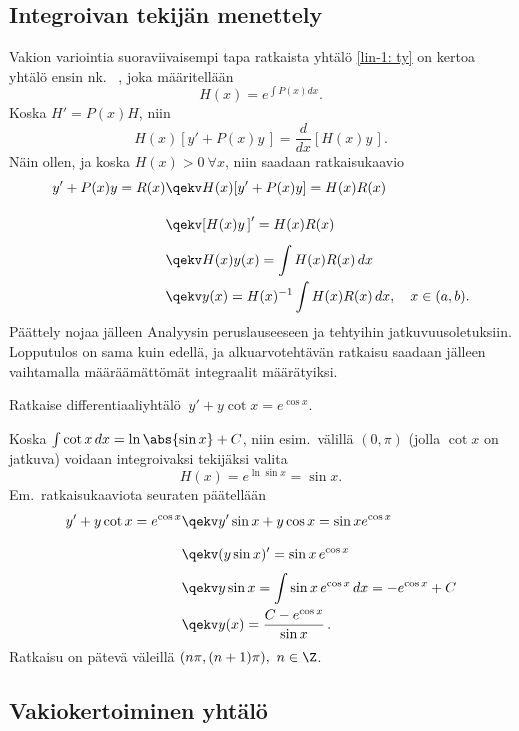 \subsection*{Integroivan tekijän menettely}

Vakion variointia suoraviivaisempi tapa ratkaista yhtälö \eqref{lin-1: ty} on kertoa yhtälö
ensin nk.\ 
, joka määritellään
\[
H(x)= e^{\int P(x)dx}.
\]
Koska $H'=P(x)H$, niin
\[
H(x)[y'+P(x)y\,] = \frac{d}{dx}[H(x)y\,].
\]
Näin ollen, ja koska $H(x)>0\ \forall x$, niin saadaan ratkaisukaavio
\begin{align*}
y'+P(x)y = R(x) &\qekv H(x)[y'+P(x)y] = H(x)R(x) \\[3.5mm]
                &\qekv [H(x)y\,]' = H(x)R(x) \\[1.5mm]
                &\qekv H(x)y(x) = \int H(x)R(x)\,dx \\
                &\qekv y(x) = H(x)^{-1}\int H(x)R(x)\,dx, \quad x\in(a,b).
\end{align*}
Päättely nojaa jälleen Analyysin peruslauseeseen ja tehtyihin jatkuvuusoletuksiin. Lopputulos
on sama kuin edellä, ja alkuarvotehtävän ratkaisu saadaan jälleen vaihtamalla määräämättömät
integraalit määrätyiksi.
\begin{Exa}
Ratkaise differentiaaliyhtälö $\ y'+y\cot x=e^{\cos x}$.
\end{Exa}
\ratk Koska $\int \cot x\,dx=\ln\abs{\sin x}+C$, niin esim.\ välillä $(0,\pi)$ 
(jolla $\cot x$ on jatkuva) voidaan integroivaksi tekijäksi valita
\[
H(x)=e^{\ln\sin x}=\sin x.
\]
Em.\ ratkaisukaaviota seuraten päätellään
\begin{align*}
y'+y\cot x=e^{\cos x} &\qekv y'\sin x+y\cos x = \sin x e^{\cos x} \\[3mm]
                      &\qekv (y\sin x)'=\sin x\,e^{\cos x} \\[1mm]
                      &\qekv y\sin x = \int \sin x\,e^{\cos x}\,dx = -e^{\cos x}+C \\
                      &\qekv y(x)=\frac{C-e^{\cos x}}{\sin x}\,.
\end{align*}
Ratkaisu on pätevä väleillä $(n\pi,(n+1)\pi),\ n\in\Z$. \loppu

\subsection*{Vakiokertoiminen yhtälö}
\index{vakiokertoiminen DY|vahv}

